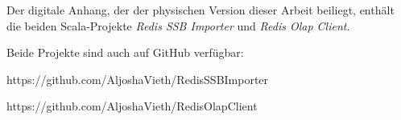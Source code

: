 Der digitale Anhang, der der physischen Version dieser Arbeit beiliegt, enthält die beiden Scala-Projekte \emph{Redis SSB Importer} und \emph{Redis Olap Client}.

Beide Projekte sind auch auf GitHub verfügbar:

https://github.com/AljoshaVieth/RedisSSBImporter

https://github.com/AljoshaVieth/RedisOlapClient